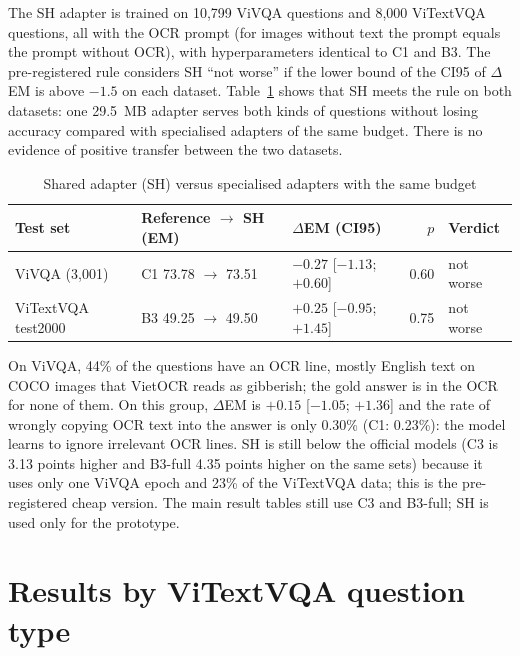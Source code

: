 The SH adapter is trained on 10,799 ViVQA questions and 8,000 ViTextVQA questions, all with
the OCR prompt (for images without text the prompt equals the prompt without OCR), with
hyperparameters identical to C1 and B3. The pre-registered rule considers SH ``not worse''
if the lower bound of the CI95 of $\Delta$EM is above $-1.5$ on each dataset.
Table~\ref{tab:res-sh} shows that SH meets the rule on both datasets: one 29.5~MB adapter
serves both kinds of questions without losing accuracy compared with specialised adapters
of the same budget. There is no evidence of positive transfer between the two datasets.

\begin{table}[htbp]
\caption{Shared adapter (SH) versus specialised adapters with the same budget}
\label{tab:res-sh}
\centering
\small
\begin{tabular}{p{}p{}p{}rp{}}
\toprule
\raggedright \textbf{Test set} & \raggedright \textbf{Reference $\to$ SH (EM)} & \raggedright \textbf{$\Delta$EM (CI95)} & \raggedright \textbf{$p$} & \raggedright \textbf{Verdict} \tabularnewline
\midrule
\raggedright ViVQA (3,001) & \raggedright C1 73.78 $\to$ 73.51 & \raggedright $-0.27$ [$-1.13$; $+0.60$] & \raggedright 0.60 & \raggedright not worse \tabularnewline
\raggedright ViTextVQA test2000 & \raggedright B3 49.25 $\to$ 49.50 & \raggedright $+0.25$ [$-0.95$; $+1.45$] & \raggedright 0.75 & \raggedright not worse \tabularnewline
\bottomrule
\end{tabular}
\end{table}

On ViVQA, 44\% of the questions have an OCR line, mostly English text on COCO images that
VietOCR reads as gibberish; the gold answer is in the OCR for none of them. On this group,
$\Delta$EM is $+0.15$ [$-1.05$; $+1.36$] and the rate of wrongly copying OCR text into the
answer is only 0.30\% (C1: 0.23\%): the model learns to ignore irrelevant OCR lines. SH is
still below the official models (C3 is 3.13 points higher and B3-full 4.35 points higher on
the same sets) because it uses only one ViVQA epoch and 23\% of the ViTextVQA data; this is
the pre-registered cheap version. The main result tables still use C3 and B3-full; SH is
used only for the prototype.

\section{Results by ViTextVQA question type}
\label{sec:res-qtype}

